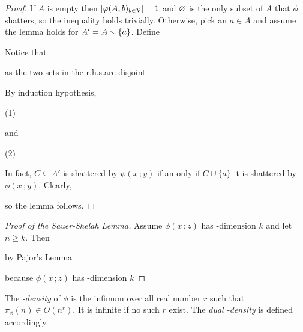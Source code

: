\documentclass[scombinatorics.tex]{subfiles}
\begin{document}
\begin{proof}
  If $A$ is empty then $|\varphi(A,b)_{b\in\EuScript V}|=1$ and $\varnothing$ is the only subset of $A$ that $\phi$ shatters, so the inequality holds trivially.
  Otherwise, pick an $a\in A$ and assume the lemma holds for $A'=A\smallsetminus\{a\}$.
  Define 


  Notice that
  
  
  as the two sets in the r.h.s.\@ are disjoint


  By induction hypothesis, 

  \hfill(1)
  
  and


  \hfill(2)

  In fact, $C\subseteq A'$ is shattered by $\psi(x\,;y)$ if an only if $C\cup\{a\}$ it is shattered by $\phi(x\,;y)$.
  Clearly, 


  so the lemma follows.
\end{proof}
  
\begin{proof}[Proof of the Sauer-Shelah Lemma]
  Assume $\phi(x\,;z)$ has \vc-dimension $k$ and let $n\ge k$.
  Then

  \smallskip

  \hfill by  Pajor's Lemma\smallskip
  
  \hfill because $\phi(x\,;z)$ has \vc-dimension $k$
\end{proof}

The \emph{\vc-density\/} of $\phi$ is the infimum over all real number $r$ such that $\pi_\phi(n)\in O(n^r)$.
It is infinite if no such $r$ exist.
The  \emph{dual \vc-density\/} is defined accordingly.
\end{document}
